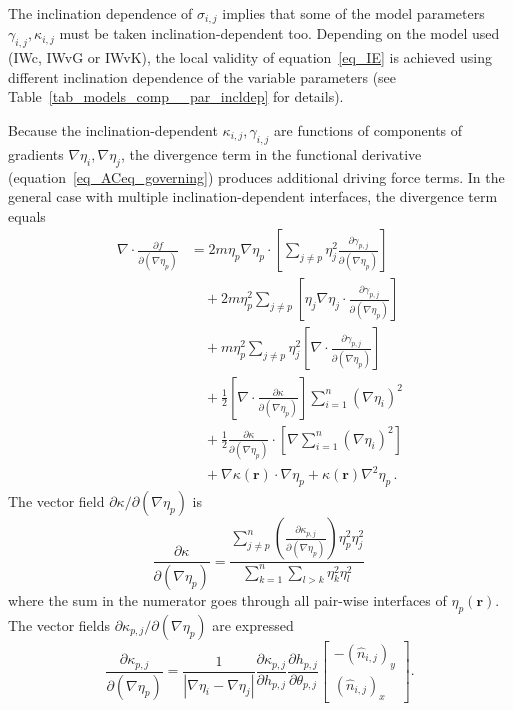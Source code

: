 The inclination dependence of $\sigma_{i,j}$ implies that some of the model parameters $\gamma_{i,j},\kappa_{i,j}$ must be taken inclination-dependent too. Depending on the model used (IWc, IWvG or IWvK), the local validity of equation~\eqref{eq_IE} is achieved using different inclination dependence of the variable parameters (see Table~\ref{tab_models_comp__par_incldep} for details).

Because the inclination-dependent $\kappa_{i,j},\gamma_{i,j}$ are functions of components of gradients $\nabla\eta_i,\nabla\eta_j$, the divergence term in the functional derivative (equation~\eqref{eq_ACeq_governing}) produces additional driving force terms. In the general case with multiple inclination-dependent interfaces, the divergence term equals
\begin{equation}\label{eq_incldep_divDFterms}
	\begin{split}
		\nabla\cdot \frac{\partial f}{\partial(\nabla \eta_p)} &= 2m\eta_p\nabla\eta_p\cdot \left[\sum_{j\neq p}  \eta_j^2\frac{\partial \gamma_{p,j}}{\partial (\nabla\eta_p)}\right]  \\ 
		&\quad+ 2m\eta_p^2\sum_{j\neq p} \left[\eta_j\nabla\eta_j \cdot \frac{\partial \gamma_{p,j}}{\partial (\nabla\eta_p)}\right] \\
		&\quad+ m\eta_p^2\sum_{j\neq p}\eta_j^2\left[\nabla\cdot\frac{\partial \gamma_{p,j}}{\partial (\nabla\eta_p)}\right] \\
		&\quad + \frac{1}{2}\left[\nabla\cdot\frac{\partial \kappa}{\partial (\nabla\eta_p)}\right]\sum_{i=1}^n(\nabla \eta_i)^2 \\
		&\quad+ \frac{1}{2}\frac{\partial \kappa}{\partial (\nabla\eta_p)}\cdot\left[\nabla\sum_{i=1}^n(\nabla \eta_i)^2\right]  \\
		&\quad+ \nabla\kappa(\bm{r})\cdot\nabla\eta_p + \kappa(\bm{r})\nabla^2\eta_p \,.
	\end{split} 
\end{equation}
The vector field $\partial \kappa/\partial(\nabla\eta_p)$ is
\begin{equation} \label{eq_dkppdGp}
	\frac{\partial \kappa}{\partial(\nabla\eta_p)} =  \frac{\sum\limits_{j\neq p}^n \left(\frac{\partial \kappa_{p,j}}{\partial (\nabla\eta_p)}\right)\eta_p^2\eta_j^2}{\sum\limits_{k=1}^n\sum\limits_{l>k}\eta_k^2\eta_l^2} \,
\end{equation}
where the sum in the numerator goes through all pair-wise interfaces of $\eta_p(\bm{r})$. The vector fields $\partial\kappa_{p,j}/\partial (\nabla\eta_p)$ are expressed
\begin{equation} \label{eq_dkppijdGp}
	\frac{\partial \kappa_{p,j}}{\partial (\nabla\eta_p)} = \frac{1}{|\nabla\eta_i-\nabla\eta_j|}\frac{\partial \kappa_{p,j}}{\partial h_{p,j}}\frac{\partial h_{p,j}}{\partial \theta_{p,j}} \left[\begin{array}{c}
		-(\hat{n}_{i,j})_y   \\
		(\hat{n}_{i,j})_x
	\end{array} \right].
\end{equation}
